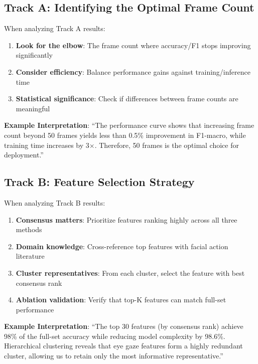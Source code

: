 \documentclass[11pt,a4paper]{article}
\begin{document}
\subsection{Track A: Identifying the Optimal Frame Count}

When analyzing Track A results:

\begin{enumerate}
    \item \textbf{Look for the elbow}: The frame count where accuracy/F1 stops improving significantly
    \item \textbf{Consider efficiency}: Balance performance gains against training/inference time
    \item \textbf{Statistical significance}: Check if differences between frame counts are meaningful
\end{enumerate}

\textbf{Example Interpretation}: ``The performance curve shows that increasing frame count beyond 50 frames yields less than 0.5\% improvement in F1-macro, while training time increases by 3$\times$. Therefore, 50 frames is the optimal choice for deployment.''

\subsection{Track B: Feature Selection Strategy}

When analyzing Track B results:

\begin{enumerate}
    \item \textbf{Consensus matters}: Prioritize features ranking highly across all three methods
    \item \textbf{Domain knowledge}: Cross-reference top features with facial action literature
    \item \textbf{Cluster representatives}: From each cluster, select the feature with best consensus rank
    \item \textbf{Ablation validation}: Verify that top-K features can match full-set performance
\end{enumerate}

\textbf{Example Interpretation}: ``The top 30 features (by consensus rank) achieve 98\% of the full-set accuracy while reducing model complexity by 98.6\%. Hierarchical clustering reveals that eye gaze features form a highly redundant cluster, allowing us to retain only the most informative representative.''
\end{document}
